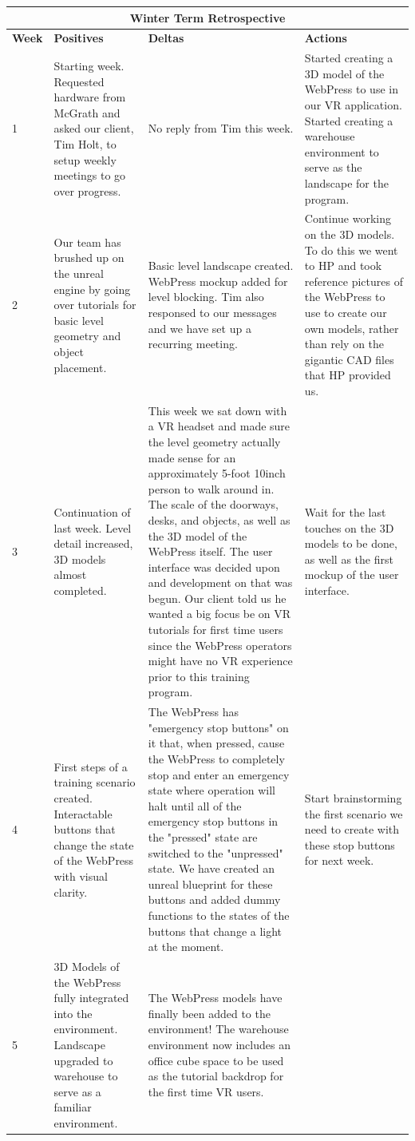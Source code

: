 \documentclass[onecolumn, draftclsnofoot,10pt, compsoc]{IEEEtran}
\begin{document}
\begin{longtable}{ |p{2cm}||p{5cm}|p{5cm}|p{5cm}|  }
 \hline
 \multicolumn{4}{|c|}{\textbf{Winter Term Retrospective}} \\
 \hline
 \textbf{Week} & \textbf{Positives} & \textbf{Deltas} & \textbf{Actions}\\
 \hline
 1 & 
    Starting week. Requested hardware from McGrath and asked our client, Tim Holt, to setup weekly meetings to go over progress.
    & No reply from Tim this week.
    & Started creating a 3D model of the WebPress to use in our VR application. Started creating a warehouse environment to serve as the landscape for the program.\\
 \hline
 2 & Our team has brushed up on the unreal engine by going over tutorials for basic level geometry and object placement.
    & Basic level landscape created. WebPress mockup added for level blocking. Tim also responsed to our messages and we have set up a recurring meeting.
    & Continue working on the 3D models. To do this we went to HP and took reference pictures of the WebPress to use to create our own models, rather than rely on the gigantic CAD files that HP provided us.\\
 \hline
 
 3 & Continuation of last week. Level detail increased, 3D models almost completed.
    & This week we sat down with a VR headset and made sure the level geometry actually made sense for an approximately 5-foot 10inch person to walk around in. The scale of the doorways, desks, and objects, as well as the 3D model of the WebPress itself. The user interface was decided upon and development on that was begun. Our client told us he wanted a big focus be on VR tutorials for first time users since the WebPress operators might have no VR experience prior to this training program.
    & Wait for the last touches on the 3D models to be done, as well as the first mockup of the user interface.\\
\hline
 4 & First steps of a training scenario created. Interactable buttons that change the state of the WebPress with visual clarity.
    & The WebPress has "emergency stop buttons" on it that, when pressed, cause the WebPress to completely stop and enter an emergency state where operation will halt until all of the emergency stop buttons in the "pressed" state are switched to the "unpressed" state. We have created an unreal blueprint for these buttons and added dummy functions to the states of the buttons that change a light at the moment.
     & 
    Start brainstorming the first scenario we need to create with these stop buttons for next week.\\
\hline
 5 & 3D Models of the WebPress fully integrated into the environment. Landscape upgraded to warehouse to serve as a familiar environment.
    & The WebPress models have finally been added to the environment! The warehouse environment now includes an office cube space to be used as the tutorial backdrop for the first time VR users.
    

\end{longtable}
\end{document}
